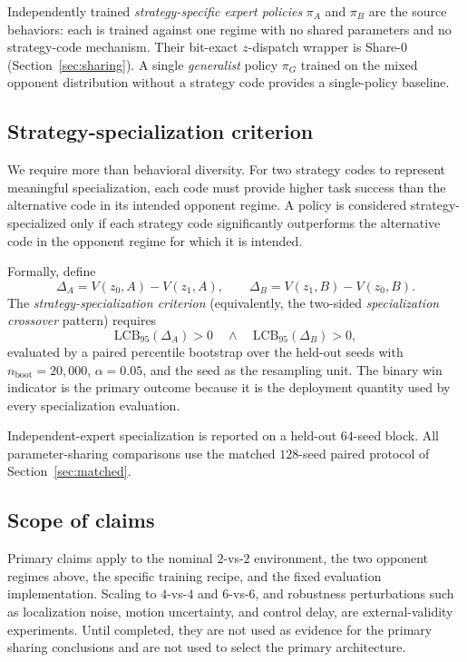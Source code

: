 \documentclass{article}
\begin{document}
Independently trained \emph{strategy-specific expert policies} $\pi_A$ and
$\pi_B$ are the source behaviors: each is trained against one regime with no
shared parameters and no strategy-code mechanism. Their bit-exact $z$-dispatch
wrapper is Share-0 (Section~\ref{sec:sharing}). A single \emph{generalist}
policy $\pi_G$ trained on the mixed opponent distribution without a strategy
code provides a single-policy baseline.

\subsection{Strategy-specialization criterion}
\label{sec:specialization}

We require more than behavioral diversity. For two strategy codes to represent
meaningful specialization, each code must provide higher task success than the
alternative code in its intended opponent regime. A policy is considered
strategy-specialized only if each strategy code significantly outperforms the
alternative code in the opponent regime for which it is intended.

Formally, define
\[
\Delta_A = V(z_0,A)-V(z_1,A),
\qquad
\Delta_B = V(z_1,B)-V(z_0,B).
\]
The \emph{strategy-specialization criterion} (equivalently, the two-sided
\emph{specialization crossover} pattern) requires
\[
\mathrm{LCB}_{95}(\Delta_A)>0
\quad\wedge\quad
\mathrm{LCB}_{95}(\Delta_B)>0,
\]
evaluated by a paired percentile bootstrap over the held-out seeds with
$n_{\mathrm{boot}}=20{,}000$, $\alpha=0.05$, and the seed as the resampling
unit. The binary win indicator is the primary outcome because it is the
deployment quantity used by every specialization evaluation.

Independent-expert specialization is reported on a held-out $64$-seed block.
All parameter-sharing comparisons use the matched $128$-seed paired protocol of
Section~\ref{sec:matched}.

\subsection{Scope of claims}

Primary claims apply to the nominal $2$-vs-$2$ environment, the two opponent
regimes above, the specific training recipe, and the fixed evaluation
implementation. Scaling to $4$-vs-$4$ and $6$-vs-$6$, and robustness
perturbations such as localization noise, motion uncertainty, and control delay,
are external-validity experiments. Until completed, they are not used as evidence
for the primary sharing conclusions and are not used to select the primary
architecture.
\end{document}
